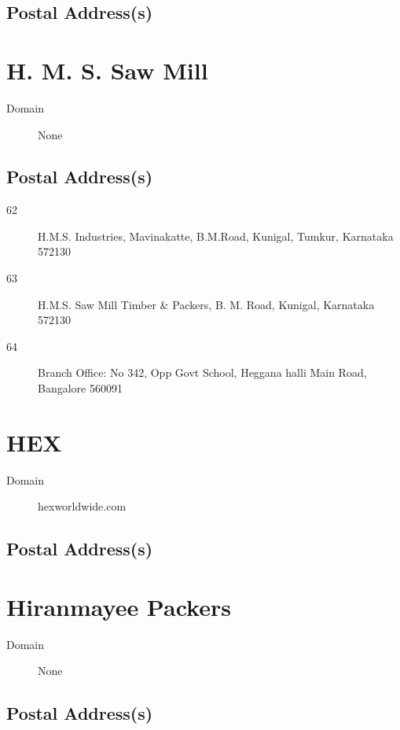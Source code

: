 \documentclass[a4paper, 11pt, twoside]{book}
\begin{document}
\subsection*{Postal Address(s)}
\section{H. M. S. Saw Mill}\label{com:6}
\begin{description}
\item[Domain]None
\end{description}
\subsection*{Postal Address(s)}
\begin{description}
\item [62]H.M.S. Industries, Mavinakatte, B.M.Road, Kunigal, Tumkur, Karnataka 572130
\end{description}
\begin{description}
\item [63]H.M.S. Saw Mill Timber \& Packers,  B. M. Road, Kunigal, Karnataka 572130
\end{description}
\begin{description}
\item [64]Branch Office: No 342, Opp Govt School, Heggana halli Main Road, Bangalore 560091
\end{description}
\section{HEX}\label{com:44}
\begin{description}
\item[Domain]hexworldwide.com
\end{description}
\subsection*{Postal Address(s)}
\section{Hiranmayee Packers}\label{com:7}
\begin{description}
\item[Domain]None
\end{description}
\subsection*{Postal Address(s)}
\end{document}

